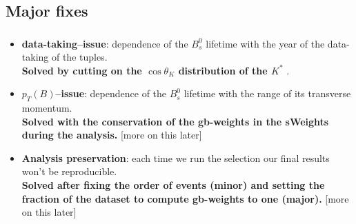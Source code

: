 \documentclass[9pt,xcolor={table,svgnames},aspectratio=43]{beamer}
\makeatletter
\newcommand{\TupleVersion}{b3r4@LcosK}
\newcommand{\highlight}[1]{ {\color{RoyalBlue}\boldmath\textbf{#1}} }
\makeatother
\begin{document}




\begin{frame}
  \maketitle
\end{frame}
%





\section{}


\subsection{Major fixes}


\begin{frame}
\frametitle{\insertsubsection}
\begin{itemize}
  \item \textbf{data-taking--issue}: dependence of the $B_s^0$ lifetime with the year of
    the data-taking of the tuples. \\ \highlight{Solved by cutting on the $\cos \theta_K$
    distribution of the $K^*$}.
  \item \textbf{{\boldmath $p_T(B)$}--issue}: dependence of the $B_s^0$ lifetime with the range of
    its transverse momentum. \\ \highlight{Solved with the conservation of the gb-weights
    in the sWeights during the analysis.} [more on this later]
  \item \textbf{Analysis preservation}: each time we run the selection our final results won't
    be reproducible. \\ \highlight{Solved after fixing the order of events (minor) and
    setting the fraction of the dataset to compute gb-weights to one (major).}
    [more on this later]
\end{itemize}

\end{frame}
\end{document}
